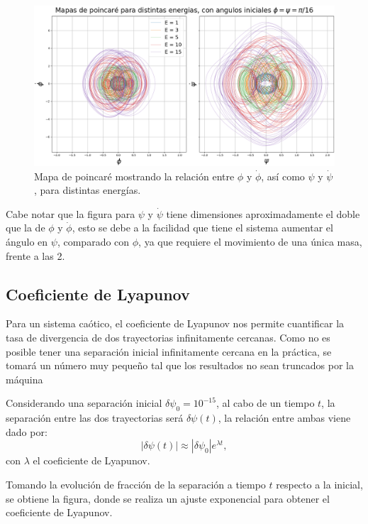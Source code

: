 \documentclass[11pt, twoside]{article} %
\begin{document}
\begin{figure}[h!]
    \centering
    \includegraphics[width=\textwidth]{plots/poincare_energias_phi_psi.png}
    \caption{Mapa de poincaré mostrando la relación entre $\phi$ y $\dot{\phi}$, 
    así como $\psi$ y $\dot{\psi}$, para distintas energías.}
    \label{fig:poincare_energias_phi_psi}
\end{figure}

Cabe notar que la figura para $\psi$ y $\dot{\psi}$ tiene dimensiones 
aproximadamente el doble que la de $\phi$ y $\dot{\phi}$, esto se debe a
la facilidad que tiene el sistema aumentar el ángulo en $\psi$, comparado 
con $\phi$, ya que requiere el movimiento de una única masa, frente a las 2.

\subsection{Coeficiente de Lyapunov}

Para un sistema caótico, el coeficiente de Lyapunov nos permite
cuantificar la tasa de divergencia de dos trayectorias infinitamente
cercanas. Como no es posible tener una separación inicial infinitamente
cercana en la práctica, se tomará un número muy pequeño tal que los
resultados no sean truncados por la máquina

Considerando una separación inicial $\delta \psi_0 = 10^{-15}$, 
al cabo de un tiempo $t$, la separación entre las dos trayectorias será 
$\delta \psi (t)$, la relación entre ambas viene dado por:
\begin{equation}
    |\delta \psi (t)| \approx |\delta \psi_0| e^{\lambda t}, 
\end{equation}
con $\lambda$ el coeficiente de Lyapunov.

Tomando la evolución de fracción de la separación a tiempo $t$ respecto 
a la inicial, se obtiene la figura, donde se realiza un ajuste exponencial
para obtener el coeficiente de Lyapunov.
\end{document}
